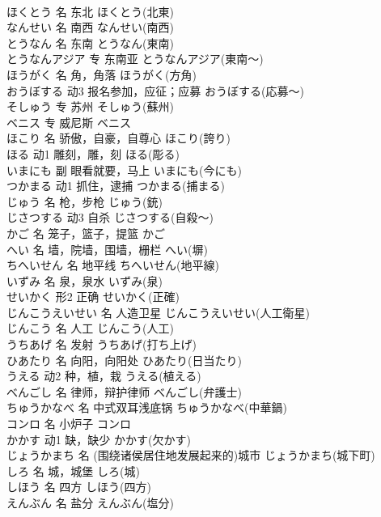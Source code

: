 \documentclass[8pt]{extreport}
\begin{document}
\begin{CJK}{UTF8}{min}
\\	ほくとう	名	东北	ほくとう(北東)	
\\	なんせい	名	南西	なんせい(南西)	
\\	とうなん	名	东南	とうなん(東南)	
\\	とうなんアジア	专	东南亚	とうなんアジア(東南～)	
\\	ほうがく	名	角，角落	ほうがく(方角)	
\\	おうぼする	动3	报名参加，应征；应募	おうぼする(応募～)	
\\	そしゅう	专	苏州	そしゅう(蘇州)	
\\	ベニス	专	威尼斯	ベニス	
\\	ほこり	名	骄傲，自豪，自尊心	ほこり(誇り)	
\\	ほる	动1	雕刻，雕，刻	ほる(彫る)	
\\	いまにも	副	眼看就要，马上	いまにも(今にも)	
\\	つかまる	动1	抓住，逮捕	つかまる(捕まる)	
\\	じゅう	名	枪，步枪	じゅう(銃)	
\\	じさつする	动3	自杀	じさつする(自殺～)	
\\	かご	名	笼子，篮子，提篮	かご	
\\	へい	名	墙，院墙，围墙，栅栏	へい(塀)	
\\	ちへいせん	名	地平线	ちへいせん(地平線)	
\\	いずみ	名	泉，泉水	いずみ(泉)	
\\	せいかく	形2	正确	せいかく(正確)	
\\	じんこうえいせい	名	人造卫星	じんこうえいせい(人工衛星)	
\\	じんこう	名	人工	じんこう(人工)	
\\	うちあげ	名	发射	うちあげ(打ち上げ)	
\\	ひあたり	名	向阳，向阳处	ひあたり(日当たり)	
\\	うえる	动2	种，植，栽	うえる(植える)	
\\	べんごし	名	律师，辩护律师	べんごし(弁護士)	
\\	ちゅうかなべ	名	中式双耳浅底锅	ちゅうかなべ(中華鍋)	
\\	コンロ	名	小炉子	コンロ	
\\	かかす	动1	缺，缺少	かかす(欠かす)	
\\	じょうかまち	名	(围绕诸侯居住地发展起来的)城市	じょうかまち(城下町)	
\\	しろ	名	城，城堡	しろ(城)	
\\	しほう	名	四方	しほう(四方)	
\\	えんぶん	名	盐分	えんぶん(塩分)	

\end{CJK}
\end{document}

